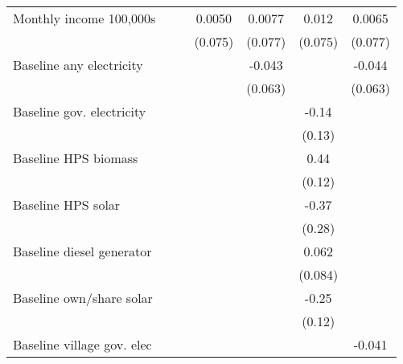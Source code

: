 \begin{table}[htbp]
\begin{tabular*}{1\hsize}{@{\hskip\tabcolsep\extracolsep\fill}l*{6}{c}}
Monthly income 100,000s&                  &                  &   0.0050         &   0.0077         &    0.012         &   0.0065         \\
                &                  &                  &  (0.075)         &  (0.077)         &  (0.075)         &  (0.077)         \\
Baseline any electricity&                  &                  &                  &   -0.043         &                  &   -0.044         \\
                &                  &                  &                  &  (0.063)         &                  &  (0.063)         \\
Baseline gov. electricity&                  &                  &                  &                  &    -0.14         &                  \\
                &                  &                  &                  &                  &   (0.13)         &                  \\
Baseline HPS biomass&                  &                  &                  &                  &     0.44\sym{***}&                  \\
                &                  &                  &                  &                  &   (0.12)         &                  \\
Baseline HPS solar&                  &                  &                  &                  &    -0.37         &                  \\
                &                  &                  &                  &                  &   (0.28)         &                  \\
Baseline diesel generator&                  &                  &                  &                  &    0.062         &                  \\
                &                  &                  &                  &                  &  (0.084)         &                  \\
Baseline own/share solar&                  &                  &                  &                  &    -0.25\sym{**} &                  \\
                &                  &                  &                  &                  &   (0.12)         &                  \\
Baseline village gov. elec&                  &                  &                  &                  &                  &   -0.041         \\

\end{tabular*}
\end{table}
